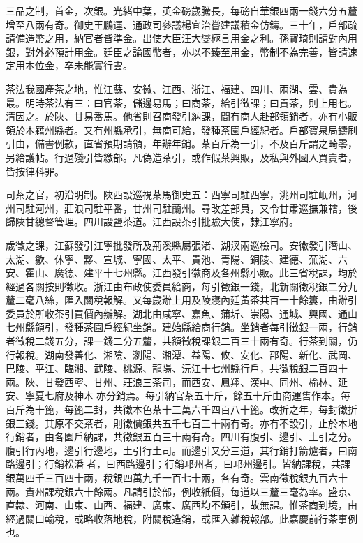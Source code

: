 \begin{pinyinscope}
三品之制，首金，次銀。光緒中葉，英金磅歲騰長，每磅自華銀四兩一錢六分五釐增至八兩有奇。御史王鵬運、通政司參議楊宜治嘗建議積金仿鑄。三十年，戶部疏請備造幣之用，納官者皆準金。出使大臣汪大燮極言用金之利。孫寶琦則請對內用銀，對外必預計用金。廷臣之論國幣者，亦以不臻至用金，幣制不為完善，皆請速定用本位金，卒未能實行雲。

茶法我國產茶之地，惟江蘇、安徽、江西、浙江、福建、四川、兩湖、雲、貴為最。明時茶法有三：曰官茶，儲邊易馬；曰商茶，給引徵課；曰貢茶，則上用也。清因之。於陜、甘易番馬。他省則召商發引納課，間有商人赴部領銷者，亦有小販領於本籍州縣者。又有州縣承引，無商可給，發種茶園戶經紀者。戶部寶泉局鑄刷引由，備書例款，直省預期請領，年辦年銷。茶百斤為一引，不及百斤謂之畸零，另給護帖。行過殘引皆繳部。凡偽造茶引，或作假茶興販，及私與外國人買賣者，皆按律科罪。

司茶之官，初沿明制。陜西設巡視茶馬御史五：西寧司駐西寧，洮州司駐岷州，河州司駐河州，莊浪司駐平番，甘州司駐蘭州。尋改差部員，又令甘肅巡撫兼轄，後歸陜甘總督管理。四川設鹽茶道。江西設茶引批驗大使，隸江寧府。

歲徵之課，江蘇發引江寧批發所及荊溪縣屬張渚、湖汊兩巡檢司。安徽發引潛山、太湖、歙、休寧、黟、宣城、寧國、太平、貴池、青陽、銅陵、建德、蕪湖、六安、霍山、廣德、建平十七州縣。江西發引徽商及各州縣小販。此三省稅課，均於經過各關按則徵收。浙江由布政使委員給商，每引徵銀一錢，北新關徵稅銀二分九釐二毫八絲，匯入關稅報解。又每歲辦上用及陵寢內廷黃茶共百一十餘簍，由辦引委員於所收茶引買價內辦解。湖北由咸寧、嘉魚、蒲圻、崇陽、通城、興國、通山七州縣領引，發種茶園戶經紀坐銷。建始縣給商行銷。坐銷者每引徵銀一兩，行銷者徵稅二錢五分，課一錢二分五釐，共額徵稅課銀二百三十兩有奇。行茶到關，仍行報稅。湖南發善化、湘陰、瀏陽、湘潭、益陽、攸、安化、邵陽、新化、武岡、巴陵、平江、臨湘、武陵、桃源、龍陽、沅江十七州縣行戶，共徵稅銀二百四十兩。陜、甘發西寧、甘州、莊浪三茶司，而西安、鳳翔、漢中、同州、榆林、延安、寧夏七府及神木亦分銷焉。每引納官茶五十斤，餘五十斤由商運售作本。每百斤為十篦，每篦二封，共徵本色茶十三萬六千四百八十篦。改折之年，每封徵折銀三錢。其原不交茶者，則徵價銀共五千七百三十兩有奇。亦有不設引，止於本地行銷者，由各園戶納課，共徵銀五百三十兩有奇。四川有腹引、邊引、土引之分。腹引行內地，邊引行邊地，土引行土司。而邊引又分三道，其行銷打箭爐者，曰南路邊引；行銷松潘者，曰西路邊引；行銷邛州者，曰邛州邊引。皆納課稅，共課銀萬四千三百四十兩，稅銀四萬九千一百七十兩，各有奇。雲南徵稅銀九百六十兩。貴州課稅銀六十餘兩。凡請引於部，例收紙價，每道以三釐三毫為率。盛京、直隸、河南、山東、山西、福建、廣東、廣西均不頒引，故無課。惟茶商到境，由經過關口輸稅，或略收落地稅，附關稅造銷，或匯入雜稅報部。此嘉慶前行茶事例也。


\end{pinyinscope}

